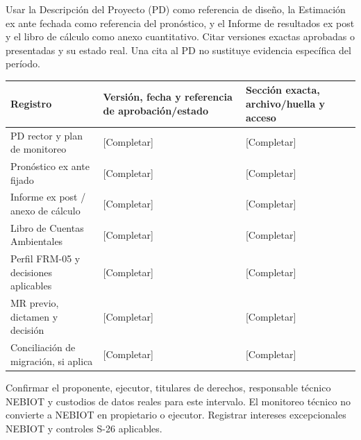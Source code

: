 Usar la Descripción del Proyecto (PD) como referencia de diseño, la Estimación ex ante fechada como referencia del pronóstico, y el Informe de resultados ex post y el libro de cálculo como anexo cuantitativo. Citar versiones exactas aprobadas o presentadas y su estado real. Una cita al PD no sustituye evidencia específica del período.\par
{}
{\sffamily\fontsize{8.6}{10.7}\selectfont\begin{longtable}{@{}P{48mm}P{61mm}P{53mm}@{}}
\toprule
\textbf{Registro} & \textbf{Versión, fecha y referencia de aprobación/estado} & \textbf{Sección exacta, archivo/huella y acceso}\\\midrule\endhead
\rule{0pt}{8mm}PD rector y plan de monitoreo & [Completar] & [Completar]\\\hline
\rule{0pt}{8mm}Pronóstico ex ante fijado & [Completar] & [Completar]\\\hline
\rule{0pt}{8mm}Informe ex post / anexo de cálculo & [Completar] & [Completar]\\\hline
\rule{0pt}{8mm}Libro de Cuentas Ambientales & [Completar] & [Completar]\\\hline
\rule{0pt}{8mm}Perfil FRM-05 y decisiones aplicables & [Completar] & [Completar]\\\hline
\rule{0pt}{8mm}MR previo, dictamen y decisión & [Completar] & [Completar]\\\hline
\rule{0pt}{8mm}Conciliación de migración, si aplica & [Completar] & [Completar]\\\hline
\end{longtable}}
Confirmar el proponente, ejecutor, titulares de derechos, responsable técnico NEBIOT y custodios de datos reales para este intervalo. El monitoreo técnico no convierte a NEBIOT en propietario o ejecutor. Registrar intereses excepcionales NEBIOT y controles S-26 aplicables.\par
